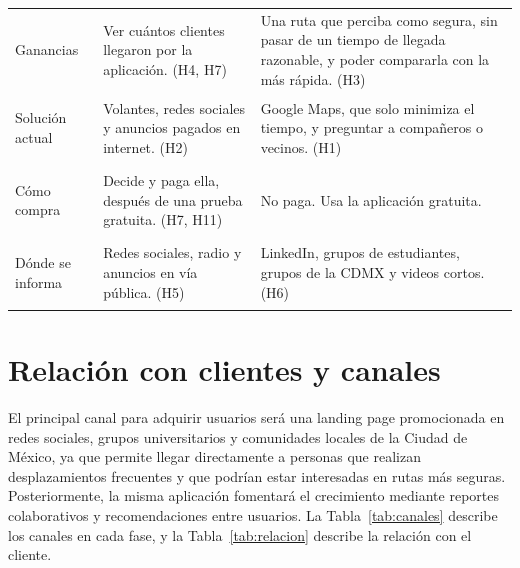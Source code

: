 \documentclass[11pt]{article}
\begin{document}
\begin{table}[H]
\begin{tabularx}{\textwidth}{@{}>{\bfseries\raggedright}p{}
                                  >{\raggedright\arraybackslash}X>{\raggedright\arraybackslash}X@{}}
    Ganancias & Ver cuántos clientes llegaron por la aplicación. (H4, H7) & Una ruta que
                perciba como segura, sin pasar de un tiempo de llegada razonable, y poder
                compararla con la más rápida. (H3) \\
    Solución actual & Volantes, redes sociales y anuncios pagados en internet. (H2) & Google
                      Maps, que solo minimiza el tiempo, y preguntar a compañeros o
                      vecinos. (H1) \\
    Cómo compra & Decide y paga ella, después de una prueba gratuita. (H7, H11) & No paga. Usa
                  la aplicación gratuita. \\
    Dónde se informa & Redes sociales, radio y anuncios en vía pública. (H5) & LinkedIn, grupos
                       de estudiantes, grupos de la CDMX y videos cortos. (H6) \\
    \bottomrule
  \end{tabularx}
\end{table}


\section{Relación con clientes y canales}
\label{sec:canales}

El principal canal para adquirir usuarios será una landing page promocionada en redes sociales, grupos universitarios y comunidades locales de la Ciudad de México, ya que permite llegar directamente a personas que realizan desplazamientos frecuentes y que podrían estar interesadas en rutas más seguras. Posteriormente, la misma aplicación fomentará el crecimiento mediante reportes colaborativos y recomendaciones entre usuarios. La Tabla~\ref{tab:canales} describe los canales en
cada fase, y la Tabla~\ref{tab:relacion} describe la relación con el cliente.
\end{document}
